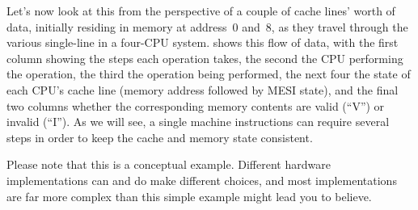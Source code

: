 Let's now look at this from the perspective of a couple of cache lines' worth
of data, initially residing in memory at address~0 and~8,
as they travel through the various single-line 
in a four-CPU system.
shows this flow of data, with the first column showing the steps
each operation takes, the second the CPU performing the operation,
the third the operation being performed, the next four the state
of each CPU's cache line (memory address followed by MESI state),
and the final two columns whether the corresponding memory contents
are valid (``V'') or invalid (``I'')\@.
As we will see, a single machine instructions can require several steps
in order to keep the cache and memory state consistent.

Please note that this is a conceptual example.
Different hardware implementations can and do make different choices,
and most implementations are far more complex than this simple
example might lead you to believe.

